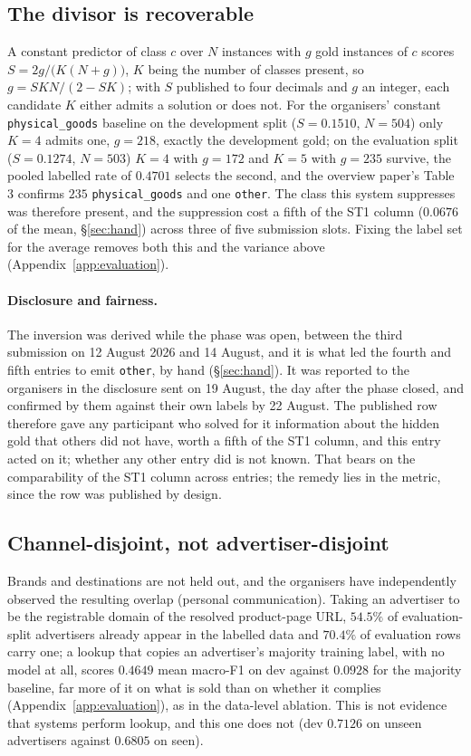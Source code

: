 \documentclass[11pt]{article}
\newcommand{\lab}[1]{\texttt{\small #1}}
\begin{document}
\subsection{The divisor is recoverable}
\label{sec:invert}

A constant predictor of class $c$ over $N$ instances with $g$ gold instances of $c$ scores
$S=2g/\bigl(K(N+g)\bigr)$, $K$ being the number of classes present, so $g = SKN/(2-SK)$; with
$S$ published to four decimals and $g$ an integer, each candidate $K$ either admits a solution
or does not. For the organisers' constant \lab{physical\_goods} baseline on the development
split ($S=0.1510$, $N=504$) only $K=4$ admits one, $g=218$, exactly the development gold; on the
evaluation split ($S=0.1274$, $N=503$) $K=4$ with $g=172$ and $K=5$ with $g=235$ survive, the
pooled labelled rate of $0.4701$ selects the second, and the overview paper's Table 3 confirms
$235$ \lab{physical\_goods} and one \lab{other}. The class this system suppresses was therefore
present, and the suppression cost a fifth of the ST1 column ($0.0676$ of the mean,
\S\ref{sec:hand}) across three of five submission slots. Fixing the label set for the average
removes both this and the variance above (Appendix~\ref{app:evaluation}).

\paragraph{Disclosure and fairness.}
The inversion was derived while the phase was open, between the third submission on 12 August
2026 and 14 August, and it is what led the fourth and fifth entries to emit \lab{other}, by
hand (\S\ref{sec:hand}). It was reported to the organisers in the disclosure sent on 19 August,
the day after the phase closed, and confirmed by them against their own labels by 22 August.
The published row therefore gave any participant who solved for it information about the
hidden gold that others did not have, worth a fifth of the ST1 column, and this entry acted on
it; whether any other entry did is not known. That bears on the comparability of the ST1
column across entries; the remedy lies in the metric, since the row was published by design.

\subsection{Channel-disjoint, not advertiser-disjoint}
\label{sec:advertiser}

Brands and destinations are not held out, and the organisers have independently observed the
resulting overlap (personal communication). Taking an advertiser to be the registrable domain
of the resolved product-page URL, $54.5\%$ of evaluation-split advertisers already appear in the
labelled data and $70.4\%$ of evaluation rows carry one; a lookup that copies an advertiser's
majority training label, with no model at all, scores $0.4649$ mean macro-F1 on dev against
$0.0928$ for the majority baseline, far more of it on what is sold than on whether it complies
(Appendix~\ref{app:evaluation}), as in the data-level ablation. This is not evidence that
systems perform lookup, and this one does not (dev $0.7126$ on unseen advertisers against
$0.6805$ on seen).
\end{document}
